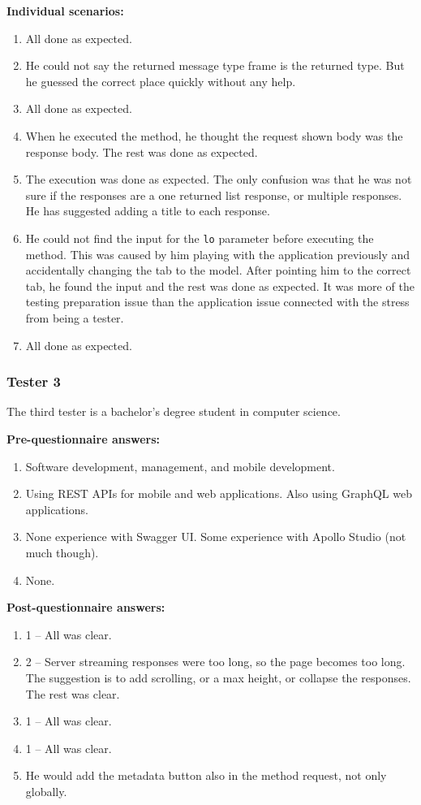 \textbf{Individual scenarios:}
\begin{enumerate}
    \item All done as expected.
    \item He could not say the returned message type frame is the returned type.
    But he guessed the correct place quickly without any help.
    \item All done as expected.
    \item When he executed the method, he thought the request shown body was the response body.
    The rest was done as expected.
    \item The execution was done as expected.
    The only confusion was that he was not sure if the responses are a one returned list response, or multiple responses.
    He has suggested adding a title to each response.
    \item He could not find the input for the \texttt{lo} parameter before executing the method.
    This was caused by him playing with the application previously and accidentally changing the tab to the model.
    After pointing him to the correct tab, he found the input and the rest was done as expected.
    It was more of the testing preparation issue than the application issue connected with the stress from being a tester.
    \item All done as expected.
\end{enumerate}

\subsubsection{Tester 3}
The third tester is a bachelor's degree student in computer science.

\textbf{Pre-questionnaire answers:}
\begin{enumerate}
    \item Software development, management, and mobile development.
    \item Using REST APIs for mobile and web applications.
    Also using GraphQL web applications.
    \item None experience with Swagger UI\@.
    Some experience with Apollo Studio (not much though).
    \item None.
\end{enumerate}

\textbf{Post-questionnaire answers:}
\begin{enumerate}
    \item 1 -- All was clear.
    \item 2 -- Server streaming responses were too long, so the page becomes too long.
    The suggestion is to add scrolling, or a max height, or collapse the responses.
    The rest was clear.
    \item 1 -- All was clear.
    \item 1 -- All was clear.
    \item He would add the metadata button also in the method request, not only globally.
\end{enumerate}

